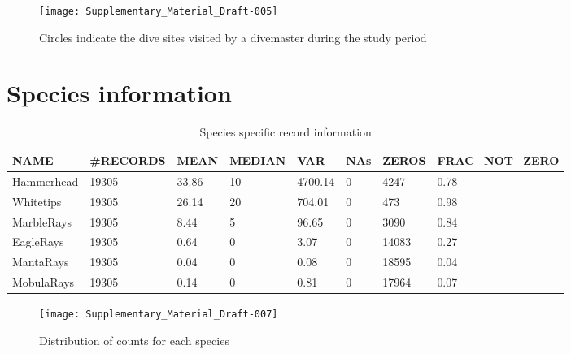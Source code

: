\documentclass[a4paper]{article}
\begin{document}

\begin{figure}[h!]
\centering
\texttt{[image: Supplementary\_Material\_Draft-005]}
\caption{Circles indicate the dive sites visited by a divemaster during the study period}
\end{figure}


\clearpage



\section{Species information}


\begin{table}[h!]
\centering
\begin{tabular}{llllllll}
  \hline
NAME & \#RECORDS & MEAN & MEDIAN & VAR & NAs & ZEROS & FRAC\_NOT\_ZERO \\ 
  \hline
Hammerhead & 19305 & 33.86 & 10 & 4700.14 & 0 & 4247 & 0.78 \\ 
  Whitetips & 19305 & 26.14 & 20 & 704.01 & 0 & 473 & 0.98 \\ 
  MarbleRays & 19305 & 8.44 & 5 & 96.65 & 0 & 3090 & 0.84 \\ 
  EagleRays & 19305 & 0.64 & 0 & 3.07 & 0 & 14083 & 0.27 \\ 
  MantaRays & 19305 & 0.04 & 0 & 0.08 & 0 & 18595 & 0.04 \\ 
  MobulaRays & 19305 & 0.14 & 0 & 0.81 & 0 & 17964 & 0.07 \\ 
   \hline
\end{tabular}
\caption{Species specific record information} 
\label{species_info}
\end{table}



\begin{figure}[h!]
\centering
\texttt{[image: Supplementary\_Material\_Draft-007]}
\caption{Distribution of counts for each species}
\end{figure}
\end{document}
